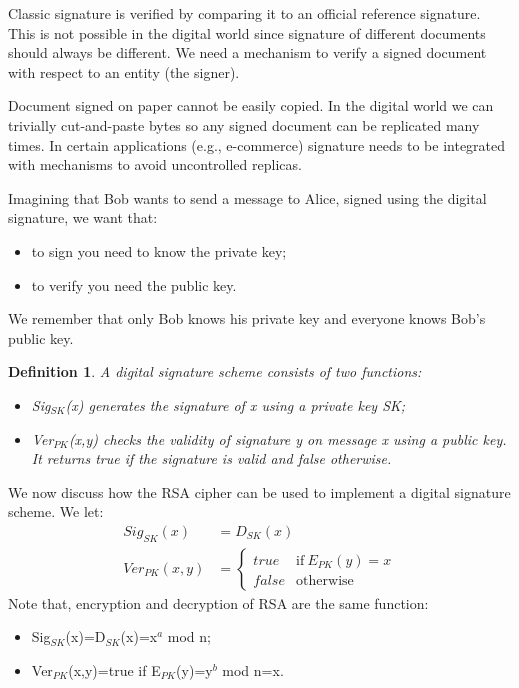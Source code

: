 \documentclass[a4paper, 12pt]{report}
\newtheorem{definition}{\textbf{Definition}}
\begin{document}
Classic signature is verified by comparing it to an official reference signature. This is not possible in the digital world since signature of different documents should always be different. We need a mechanism to verify a signed document with respect to an entity (the signer).

Document signed on paper cannot be easily copied. In the digital world we can trivially cut-and-paste bytes so any signed document can be replicated many times. In certain applications (e.g., e-commerce) signature needs to be integrated with mechanisms to avoid uncontrolled replicas.

Imagining that Bob wants to send a message to Alice, signed using the digital signature, we want that:
\begin{itemize}
	\item to sign you need to know the private key;
	\item to verify you need the public key.
\end{itemize}
We remember that only Bob knows his private key and everyone knows Bob's public key.

\begin{definition}
	A digital signature scheme consists of two functions:
	\begin{itemize}
		\item Sig$_{SK}$(x) generates the signature of x using a private key SK;
		\item Ver$_{PK}$(x,y) checks the validity of signature y on message x using a public key. It returns true if the signature is valid and false otherwise.
	\end{itemize}
\end{definition}

We now discuss how the RSA cipher can be used to implement a digital signature scheme. We let:
\begin{align*}
	Sig_{SK}(x) &= D_{SK}(x)\\
	Ver_{PK}(x,y) &= 
	\begin{cases}
	true & \text{if}\  E_{PK}(y)=x\\
	false & \text{otherwise}
	\end{cases}
\end{align*}
Note that, encryption and decryption of RSA are the same function:
\begin{itemize}
	\item Sig$_{SK}$(x)=D$_{SK}$(x)=x$^a$ mod n;
	\item Ver$_{PK}$(x,y)=true if E$_{PK}$(y)=y$^b$ mod n=x.
\end{itemize}
\end{document}
